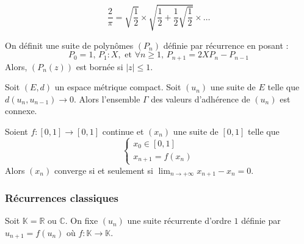   \begin{application}
    \[ \frac{2}{\pi} = \sqrt{\frac{1}{2}} \times \sqrt{\frac{1}{2} + \frac{1}{2} \sqrt{\frac{1}{2}}} \times \dots \]
  \end{application}


  \begin{example}
    On définit une suite de polynômes $(P_n)$ définie par récurrence en posant :
    \[ P_0 = 1, \, P_1 : X, \text{ et } \forall n \geq 1, \, P_{n+1} = 2XP_n - P_{n-1} \]
    Alors, $(P_n(z))$ est bornée si $\vert z \vert \leq 1$.
  \end{example}


  \begin{theorem}
    Soit $(E, d)$ un espace métrique compact. Soit $(u_n)$ une suite de $E$ telle que $d(u_n,u_{n-1}) \longrightarrow 0$. Alors l'ensemble $\Gamma$ des valeurs d'adhérence de $(u_n)$ est connexe.
  \end{theorem}

  \begin{corollary}
    Soient $f : [0, 1] \rightarrow [0, 1]$ continue et $(x_n)$ une suite de $[0, 1]$ telle que
    \[ \begin{cases} x_0 \in [0, 1] \\ x_{n+1} = f(x_n) \end{cases} \]
    Alors $(x_n)$ converge si et seulement si $\lim_{n \rightarrow +\infty } x_{n+1} - x_n = 0$.
  \end{corollary}

  \subsubsection{Récurrences classiques}


  Soit $\mathbb{K} = \mathbb{R}$ ou $\mathbb{C}$. On fixe $(u_n)$ une suite récurrente d'ordre $1$ définie par $u_{n+1} = f(u_n)$ où $f : \mathbb{K} \rightarrow \mathbb{K}$.

